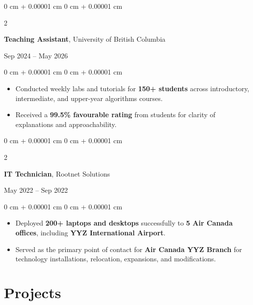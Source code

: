 \documentclass[9pt, letterpaper]{extarticle}
\newenvironment{highlights}{
    \begin{itemize}[
        topsep=0.10 cm,
        parsep=0.10 cm,
        partopsep=0pt,
        itemsep=0pt,
        leftmargin=0 cm + 10pt
    ]
}{
    \end{itemize}
} %
\newenvironment{onecolentry}{
    \begin{adjustwidth}{
        0 cm + 0.00001 cm
    }{
        0 cm + 0.00001 cm
    }
}{
    \end{adjustwidth}
} %
\newenvironment{twocolentry}[2][]{
    \onecolentry
    \def\secondColumn{#2}
    \setcolumnwidth{\fill, 4.5 cm}
    \begin{paracol}{2}
}{
    \switchcolumn \raggedleft \secondColumn
    \end{paracol}
    \endonecolentry
} %
\begin{document}
        \vspace{0.2 cm}
    \begin{twocolentry}{Sep 2024 – May 2026}
        \textbf{Teaching Assistant}, University of British Columbia
    \end{twocolentry}
    \vspace{0.10 cm}
    \begin{onecolentry}
        \begin{highlights}
            \item Conducted weekly labs and tutorials for \textbf{150+ students} across introductory, intermediate, and upper-year algorithms courses.
            \item Received a \textbf{99.5\% favourable rating} from students for clarity of explanations and approachability.
        \end{highlights}
    \end{onecolentry}
    \vspace{0.2 cm}
    \begin{twocolentry}{May 2022 – Sep 2022}
        \textbf{IT Technician}, Rootnet Solutions
    \end{twocolentry}
    \vspace{0.10 cm}
    \begin{onecolentry}
        \begin{highlights}
            \item Deployed \textbf{200+ laptops and desktops} successfully to \textbf{5 Air Canada offices}, including \textbf{YYZ International Airport}.
            \item Served as the primary point of contact for \textbf{Air Canada YYZ Branch} for technology installations, relocation, expansions, and modifications.
        \end{highlights}
    \end{onecolentry}

    
    \section{Projects}
\end{document}
